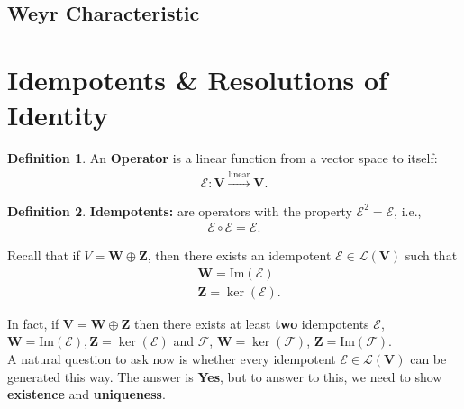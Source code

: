 \documentclass{article}
\theoremstyle{definition}
\newtheorem{defn}{Definition}[section]
\newcommand{\F}{\mathcal{F}}
\newcommand{\V}{\mathbf{V}}
\newcommand{\W}{\mathbf{W}}
\newcommand{\Z}{\mathbf{Z}}
\newcommand{\lag}{\mathcal{L}}
\newcommand{\E}{\mathcal{E}}
\newcommand{\ima}{\text{Im}}
\newcommand{\lin}{\overset{\text{linear}}{\longrightarrow}}
\begin{document}
\subsection{Weyr Characteristic}

\newpage
\section{Idempotents \& Resolutions of Identity}
\begin{defn}
	An \textbf{Operator} is a linear function from a vector space to itself:
	\begin{align*}
	\E : \V \lin \V.
	\end{align*}
\end{defn}


\begin{defn}
	\textbf{Idempotents:} are operators with the property $\E^2 = \E$, i.e., 
	\begin{align*}
	\E \circ \E = \E.
	\end{align*}
	
	Recall that if $V = \W \oplus \Z$, then there exists an idempotent $\E \in \lag(\V)$ such that
	\begin{align*}
	&\W = \ima(\E)\\
	&\Z = \ker(\E).
	\end{align*}
\end{defn}
In fact, if $\V = \W \oplus \Z$ then there exists at least \textbf{two} idempotents $\E$, $\W = \ima(\E), \Z = \ker(\E)$ and $\F$, $\W = \ker(\F)$, $\Z = \ima(\F)$.\\

A natural question to ask now is whether every idempotent $\E \in \lag(\V)$ can be generated this way. The answer is \textbf{Yes}, but to answer to this, we need to show \textbf{existence} and \textbf{uniqueness}. \\
\end{document}
